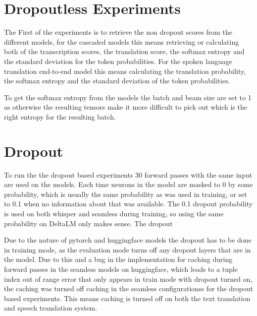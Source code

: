 \section{Dropoutless Experiments}
The First of the experiments is to retrieve the non dropout scores from the different models, for the cascaded models this means retrieving or calculating both of the transcription scores, the translation score, the softmax entropy and the standard deviation for the token probabilities. 
For the spoken language translation end-to-end model this means calculating the translation probability, the softmax entropy and the standard deviation of the token probabilities.


To get the softmax entropy from the models the batch and beam size are set to 1 as otherwise the resulting tensors make it more difficult to pick out which is the right entropy for the resulting batch. 


\section{Dropout}\label{experiment:dropout}
To run the the dropout based experiments 30 forward passes with the same input are used on the models. 
Each time neurons in the model are masked to 0 by some probability, which is usually the same probability as was used in training, or set to 0.1 when no information about that was available. The 0.1 dropout probability is used on both whisper and seamless during training, so using the same probability on DeltaLM only makes sense. The dropout 

Due to the nature of pytorch and huggingface models the dropout has to be done in training mode, as the evaluation mode turns off any dropout layers that are in the model. Due to this and a bug in the implementation for caching during forward passes in the seamless models on huggingface, which leads to a tuple index out of range error that only appears in train mode with dropout turned on, the caching was turned off caching in the seamless configurationss for the dropout based experiments. This means caching is turned off on both the text translation and speech translation system.


